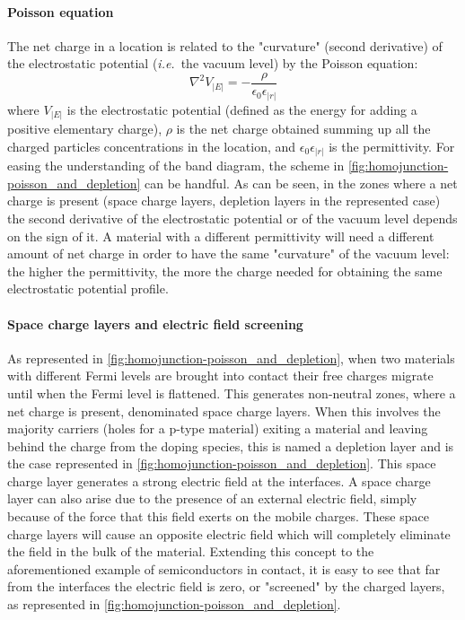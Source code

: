 		\paragraph{Poisson equation}
		The net charge in a location is related to the "curvature" (second derivative) of the electrostatic potential (\textsl{i.e.}\ the vacuum level) by the Poisson equation:
		\begin{equation}
			\nabla^2 V_|E| = -\frac{\rho}{\epsilon_0 \epsilon_|r|}
		\end{equation}
		where $V_|E|$ is the electrostatic potential (defined as the energy for adding a positive elementary charge), $\rho$ is the net charge obtained summing up all the charged particles concentrations in the location, and $\epsilon_0 \epsilon_|r|$ is the permittivity.
		For easing the understanding of the band diagram, the scheme in \cref{fig:homojunction-poisson_and_depletion} can be handful.
		As can be seen, in the zones where a net charge is present (space charge layers, depletion layers in the represented case) the second derivative of the electrostatic potential or of the vacuum level depends on the sign of it.
		A material with a different permittivity will need a different amount of net charge in order to have the same "curvature" of the vacuum level: the higher the permittivity, the more the charge needed for obtaining the same electrostatic potential profile.
	
		\paragraph{Space charge layers and electric field screening}\label{intro-space_charge}
		As represented in \cref{fig:homojunction-poisson_and_depletion}, when two materials with different Fermi levels are brought into contact their free charges migrate until when the Fermi level is flattened.
		This generates non-neutral zones, where a net charge is present, denominated space charge layers.
		When this involves the majority carriers (holes for a p-type material) exiting a material and leaving behind the charge from the doping species, this is named a depletion layer and is the case represented in \cref{fig:homojunction-poisson_and_depletion}.
		This space charge layer generates a strong electric field at the interfaces.
		A space charge layer can also arise due to the presence of an external electric field, simply because of the force that this field exerts on the mobile charges.
		These space charge layers will cause an opposite electric field which will completely eliminate the field in the bulk of the material.
		Extending this concept to the aforementioned example of semiconductors in contact, it is easy to see that far from the interfaces the electric field is zero, or "screened" by the charged layers, as represented in \cref{fig:homojunction-poisson_and_depletion}.
		
